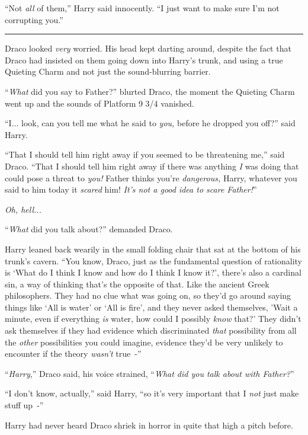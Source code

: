 ``Not \emph{all} of them,'' Harry said innocently. ``I just want to make sure I'm not corrupting you.''

\begin{center}\rule{3in}{0.4pt}\end{center}

Draco looked \emph{very} worried. His head kept darting around, despite the fact that Draco had insisted on them going down into Harry's trunk, and using a true Quieting Charm and not just the sound-blurring barrier.

``\emph{What} did you say to Father?'' blurted Draco, the moment the Quieting Charm went up and the sounds of Platform 9 3/4 vanished.

``I... look, can you tell me what he said to \emph{you,} before he dropped you off?'' said Harry.

``That I should tell him right away if you seemed to be threatening me,'' said Draco. ``That I should tell him right away if there was anything \emph{I} was doing that could pose a threat to \emph{you!} Father thinks you're \emph{dangerous,} Harry, whatever you said to him today it \emph{scared} him! \emph{It's not a good idea to scare Father!}''

\emph{Oh, hell...}

``\emph{What} did you talk about?'' demanded Draco.

Harry leaned back wearily in the small folding chair that sat at the bottom of his trunk's cavern. ``You know, Draco, just as the fundamental question of rationality is `What do I think I know and how do I think I know it?', there's also a cardinal sin, a way of thinking that's the opposite of that. Like the ancient Greek philosophers. They had no clue what was going on, so they'd go around saying things like `All is water' or `All is fire', and they never asked themselves, 'Wait a minute, even if everything \emph{is} water, how could I possibly \emph{know} that?' They didn't ask themselves if they had evidence which discriminated \emph{that} possibility from all the \emph{other} possibilities you could imagine, evidence they'd be very unlikely to encounter if the theory \emph{wasn't} true~-''

``\emph{Harry},'' Draco said, his voice strained, ``\emph{What did you talk about with Father?}''

``I don't know, actually,'' said Harry, ``so it's very important that I \emph{not} just make stuff up~-''

Harry had never heard Draco shriek in horror in quite that high a pitch before.
